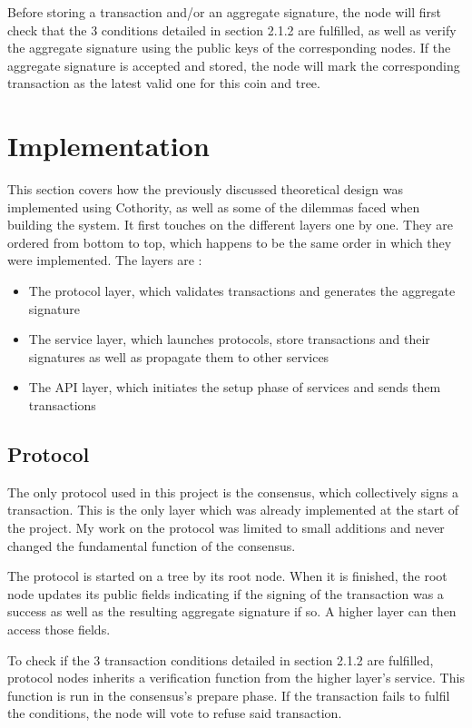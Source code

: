 \documentclass[11pt, a4paper, twoside, openright]{article}
\begin{document}
Before storing a transaction and/or an aggregate signature, the node will first check that the 3 conditions detailed in section 2.1.2 are fulfilled, as well as verify the aggregate signature using the public keys of the corresponding nodes. If the aggregate signature is accepted and stored, the node will mark the corresponding transaction as the latest valid one for this coin and tree.





\section{Implementation}
\label{Implementation}

This section covers how the previously discussed theoretical design was implemented using Cothority, as well as some of the dilemmas faced when building the system. It first touches on the different layers one by one. They are ordered from bottom to top, which happens to be the same order in which they were implemented. The layers are :
\begin{itemize}
\itemsep0em
\item The protocol layer, which validates transactions and generates the aggregate signature
\item The service layer, which launches protocols, store transactions and their signatures as well as propagate them to other services
\item The API layer, which initiates the setup phase of services and sends them transactions
\end{itemize}

\subsection{Protocol}

The only protocol used in this project is the consensus, which collectively signs a transaction. This is the only layer which was already implemented at the start of the project. My work on the protocol was limited to small additions and never changed the fundamental function of the consensus.

The protocol is started on a tree by its root node. When it is finished, the root node updates its public fields indicating if the signing of the transaction was a success as well as the resulting aggregate signature if so. A higher layer can then access those fields.

To check if the 3 transaction conditions detailed in section 2.1.2 are fulfilled, protocol nodes inherits a verification function from the higher layer's service. This function is run in the consensus's prepare phase. If the transaction fails to fulfil the conditions, the node will vote to refuse said transaction.
\end{document}
